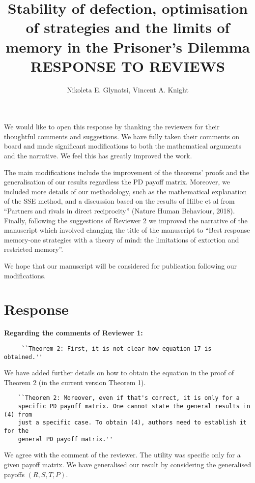 \documentclass{article}
\title{Stability of defection, optimisation of strategies and the limits of
memory in the Prisoner's Dilemma RESPONSE TO REVIEWS}
\author{Nikoleta E. Glynatsi, Vincent A. Knight}
\begin{document}
\maketitle

We would like to open this response by thanking the reviewers for their
thoughtful comments and suggestions. We have fully taken their comments on board
and made significant modifications to both the mathematical arguments and the narrative. We feel this has greatly improved the work.

The main modifications include the improvement of the theorems' proofs and the
generalisation of our results regardless the PD payoff matrix. Moreover, we
included more details of our methodology, such as the mathematical explanation
of the SSE method, and a discussion based on the results of Hilbe et al from
``Partners and rivals in direct reciprocity'' (Nature Human Behaviour, 2018).
Finally, following the suggestions of Reviewer 2 we improved the narrative of
the manuscript which involved changing the title of the manuscript to 
``Best response memory-one strategies with a theory of mind: the limitations
of extortion and restricted memory''.

We hope that our manuscript will be considered for publication following our
modifications.

\section{Response}

\textbf{Regarding the comments of Reviewer 1:}

\begin{verbatim}
     ``Theorem 2: First, it is not clear how equation 17 is obtained.''
\end{verbatim}

We have added further details on how to obtain the equation in the proof of Theorem 2
(in the current version Theorem 1).

\begin{verbatim}
    ``Theorem 2: Moreover, even if that's correct, it is only for a
    specific PD payoff matrix. One cannot state the general results in (4) from
    just a specific case. To obtain (4), authors need to establish it for the
    general PD payoff matrix.''
\end{verbatim}

We agree with the comment of the reviewer. The utility was
specific only for a given payoff matrix. We have generalised our result by
considering the generalised payoffs \((R, S, T, P)\).
\end{document}
